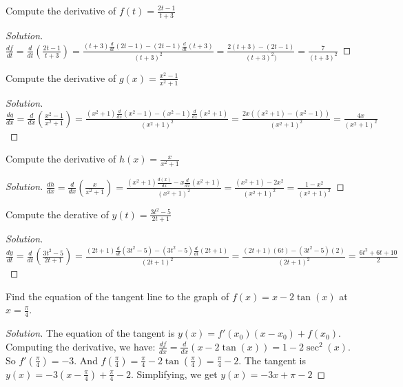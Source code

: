 \documentclass[crop=false,class=article,oneside]{standalone}
\begin{document}
            \begin{problem}
            Compute the derivative of $f(t)=\frac{2t-1}{t+3}$
            \end{problem}
            \begin{proof}[Solution]
            $\frac{df}{dt}=\frac{d}{dt}(\frac{2t-1}{t+3})=\frac{(t+3)\frac{d}{dt}(2t-1)-(2t-1)\frac{d}{dt}(t+3)}{(t+3)^{2}}=\frac{2(t+3)-(2t-1)}{(t+3)^{2})}=\frac{7}{(t+3)^{2}}$
            \end{proof}
            \begin{problem}
            Compute the derivative of $g(x)=\frac{x^{2}-1}{x^{2}+1}$
            \end{problem}
            \begin{proof}[Solution]
            $\frac{dg}{dx}=\frac{d}{dx}(\frac{x^{2}-1}{x^{2}+1})=\frac{(x^{2}+1)\frac{d}{dx}(x^{2}-1)-(x^{2}-1)\frac{d}{dx}(x^{2}+1)}{(x^{2}+1)^{2}}=\frac{2x((x^{2}+1)-(x^{2}-1))}{(x^{2}+1)^{2}}=\frac{4x}{(x^{2}+1)^{2}}$
            \end{proof}
            \begin{problem}
            Compute the derivative of $h(x)=\frac{x}{x^{2}+1}$
            \end{problem}
            \begin{proof}[Solution]
            $\frac{dh}{dx}=\frac{d}{dx}(\frac{x}{x^{2}+1})=\frac{(x^{2}+1)\frac{d(x)}{dx}-x\frac{d}{dx}(x^{2}+1)}{(x^{2}+1)^{2}}=\frac{(x^{2}+1)-2x^{2}}{(x^{2}+1)^{2}}=\frac{1-x^{2}}{(x^{2}+1)^{2}}$
            \end{proof}
            \begin{problem}
            Compute the derative of $y(t)=\frac{3t^{2}-5}{2t+1}$
            \end{problem}
            \begin{proof}[Solution]
            $\frac{dy}{dt}=\frac{d}{dt}(\frac{3t^{2}-5}{2t+1})=\frac{(2t+1)\frac{d}{dt}(3t^{2}-5)-(3t^{2}-5)\frac{d}{dt}(2t+1)}{(2t+1)^{2}}=\frac{(2t+1)(6t)-(3t^{2}-5)(2)}{(2t+1)^{2}}=\frac{6t^{2}+6t+10}{2}$
            \end{proof}
            \begin{problem}
            Find the equation of the tangent line to the graph of $f(x)=x-2\tan(x)$ at $x=\frac{\pi}{4}$.
            \end{problem}
            \begin{proof}[Solution]
            The equation of the tangent is $y(x)=f'(x_{0})(x-x_{0})+f(x_{0})$. Computing the derivative, we have: $\frac{df}{dx}=\frac{d}{dx}(x-2\tan(x))=1-2\sec^{2}(x)$. So $f'(\frac{\pi}{4})=-3$. And $f(\frac{\pi}{4})=\frac{\pi}{4}-2\tan(\frac{\pi}{4})=\frac{\pi}{4}-2$. The tangent is $y(x)=-3(x-\frac{\pi}{4})+\frac{\pi}{4}-2$. Simplifying, we get $y(x)=-3x+\pi-2$
            \end{proof}
\end{document}
